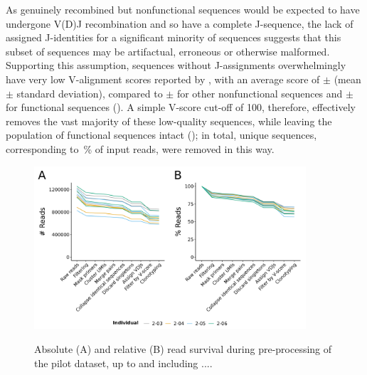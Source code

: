 As genuinely recombined but nonfunctional sequences would be expected to have undergone V(D)J recombination and so have a complete J-sequence, the lack of assigned J-identities for a significant minority of sequences suggests that this subset of sequences may be artifactual, erroneous or otherwise malformed. Supporting this assumption, sequences without J-assignments overwhelmingly have very low V-alignment scores reported by , with an average score of  $\pm$  (mean $\pm$ standard deviation), compared to  $\pm$  for other nonfunctional sequences and  $\pm$  for functional sequences (). A simple V-score cut-off of 100, therefore, effectively removes the vast majority of these low-quality sequences, while leaving the population of functional sequences intact (); in total,  unique sequences, corresponding to \,\% of input reads, were removed in this way.

\begin{figure}
\centering
\includegraphics[width = 0.9\textwidth]{_Figures/png/pilot-read-survival-all.png}
\begin{subfigure}{0em}
\label{fig:igseq-pilot-read-survival-all-a}
\end{subfigure}
\begin{subfigure}{0em}
\label{fig:igseq-pilot-read-survival-all-b}
\end{subfigure}
\caption{Absolute (A) and relative (B) read survival during pre-processing of the pilot \igseq dataset, up to and including ....} %
\label{fig:igseq-pilot-read-survival-all}
\end{figure} %

